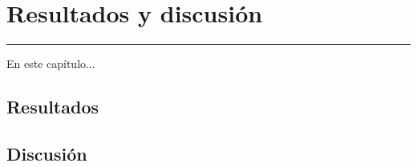 \chapter{Resultados y discusión} \label{chap:Resultados}
\hrule
\vspace{3mm}

En este capítulo...


\section{Resultados}


\section{Discusión}